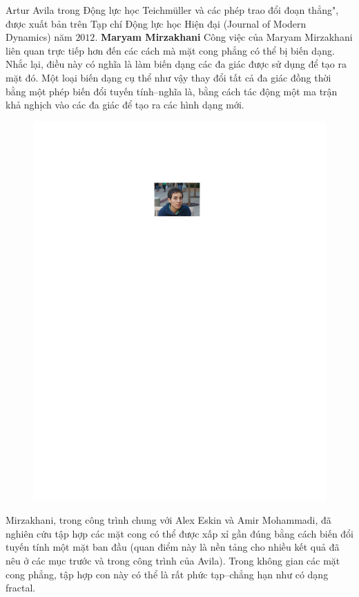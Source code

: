 \begin{multicols}{2}
	Artur Avila trong Động lực học Teichmüller và các phép trao đổi đoạn thẳng", được xuất bản trên Tạp chí Động lực học Hiện đại (Journal
	of Modern Dynamics) năm $2012$.
	\vskip 0.1cm
	{\bf\color{duongvaotoanhoc}Maryam Mirzakhani}
	\vskip 0.1cm
	Công việc của Maryam Mirzakhani liên quan trực tiếp hơn đến các cách mà mặt cong  phẳng có thể bị biến dạng. Nhắc lại, điều này có nghĩa là làm biến dạng các đa giác được sử dụng để tạo
	ra mặt đó. Một loại biến dạng cụ thể như vậy thay đổi tất cả đa giác đồng thời bằng một phép biến đổi tuyến tính--nghĩa là, bằng cách tác động một ma trận khả nghịch vào các đa giác để tạo ra các hình dạng mới.
	\begin{figure}[H]
		\centering
		\captionsetup{labelformat= empty, justification=centering}
		\includegraphics[width= 1\linewidth]{9}
		\vspace*{-15pt}
	\end{figure}
	Mirzakhani, trong công trình chung với Alex Eskin và Amir Mohammadi, đã nghiên cứu tập hợp các mặt cong có thể được xấp xỉ gần đúng bằng cách biến đổi tuyến tính một mặt ban đầu (quan điểm này là nền tảng cho nhiều kết quả đã nêu ở các mục trước và trong công trình của Avila). Trong không gian các mặt cong phẳng, tập hợp con này có thể là rất phức tạp--chẳng hạn như có dạng fractal.

\end{multicols}
